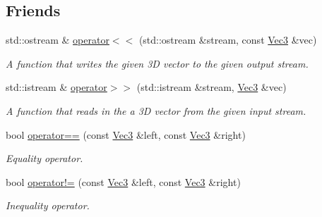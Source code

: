 \subsection*{Friends}
\begin{DoxyCompactItemize}
\item 
std\+::ostream \& \hyperlink{classgfxmath_1_1_vec3_a9902784eb40b0c5ee0378e1c2526eb1e}{operator$<$$<$} (std\+::ostream \&stream, const \hyperlink{classgfxmath_1_1_vec3}{Vec3} \&vec)
\begin{DoxyCompactList}\small\item\em A function that writes the given 3\+D vector to the given output stream. \end{DoxyCompactList}\item 
std\+::istream \& \hyperlink{classgfxmath_1_1_vec3_acf645c325558f6e8eabcbad87b4eea50}{operator$>$$>$} (std\+::istream \&stream, \hyperlink{classgfxmath_1_1_vec3}{Vec3} \&vec)
\begin{DoxyCompactList}\small\item\em A function that reads in the a 3\+D vector from the given input stream. \end{DoxyCompactList}\item 
bool \hyperlink{classgfxmath_1_1_vec3_a73bad4468d068dd9b46b313330874c0c}{operator==} (const \hyperlink{classgfxmath_1_1_vec3}{Vec3} \&left, const \hyperlink{classgfxmath_1_1_vec3}{Vec3} \&right)
\begin{DoxyCompactList}\small\item\em Equality operator. \end{DoxyCompactList}\item 
bool \hyperlink{classgfxmath_1_1_vec3_ad5a37b5aca0611e88fb74d9dd01f307a}{operator!=} (const \hyperlink{classgfxmath_1_1_vec3}{Vec3} \&left, const \hyperlink{classgfxmath_1_1_vec3}{Vec3} \&right)
\begin{DoxyCompactList}\small\item\em Inequality operator. \end{DoxyCompactList}\end{DoxyCompactItemize}
